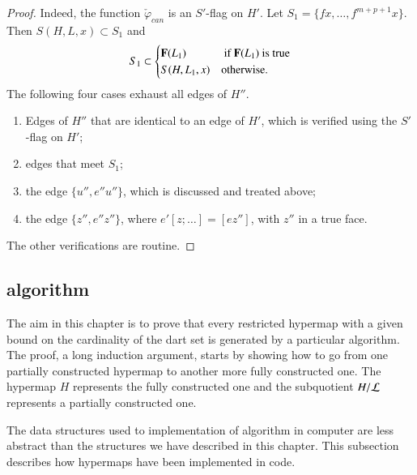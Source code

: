 \begin{proof}
   Indeed, the
function $\check\varphi_{can}$ is an $S'$-flag on $H'$.  
Let $S_1 = \{f x,\ldots,f^{m+p+1} x \}$.  Then
$S(H,L,x)\subset S_1$ and
\[
 S_1 \subset \begin{cases} {\mathbf F}(L_1) & \text{ if } {\mathbf F}(L_1) \text{ is true}
\\ S(H,L_1,x) & \text{otherwise}.\end{cases}
\]
The following four cases exhaust all edges of $H''$.
\begin{enumerate}
\item Edges of $H''$ that are identical to an edge of $H'$, which is
verified using  the $S'$-flag on $H'$;
\item edges that meet $S_1$;
\item the edge $\{u'',e''u''\}$, which is discussed and treated above;
\item the edge $\{z'',e''z''\}$, 
where $e'[z;\ldots]=[ez'']$, with $z''$ in a true face.
\end{enumerate}


The other verifications are routine.
\end{proof}


\subsection{algorithm}\label{sec:hypermap-algorithm}

The aim in this chapter is to prove that every restricted hypermap
with a given bound on the cardinality of the dart set is generated by
a particular algorithm.  The proof, a long induction argument, starts
by showing how to go from one partially constructed hypermap to
another more fully constructed one.  The hypermap $H$ represents the
fully constructed one and the subquotient $H/{\cal L}$ represents a
partially constructed one.

The data structures used to implementation of algorithm in computer
are less abstract than the structures we have described in this
chapter.  This subsection describes how hypermaps have been
implemented in code.


